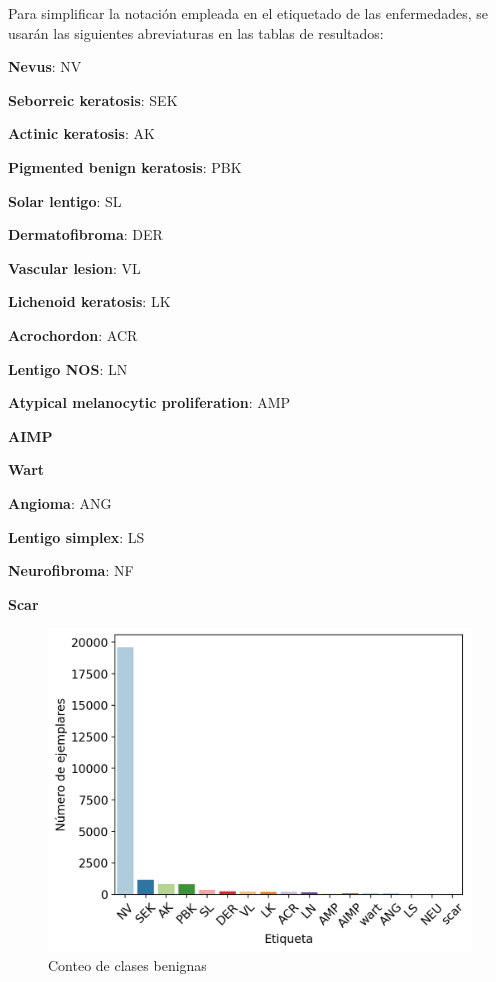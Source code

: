 Para simplificar la notación empleada en el etiquetado de las enfermedades, se usarán las siguientes abreviaturas en las tablas de resultados:
\begin{multiitem}
	\item \textbf{Nevus}: NV
	\item \textbf{Seborreic keratosis}: SEK 
	\item \textbf{Actinic keratosis}: AK            
	\item \textbf{Pigmented benign keratosis}: PBK 
	\item \textbf{Solar lentigo}: SL
	\item \textbf{Dermatofibroma}: DER 
	\item \textbf{Vascular lesion}: VL                        
	\item \textbf{Lichenoid keratosis}: LK
	\item \textbf{Acrochordon}: ACR
	\item \textbf{Lentigo NOS}: LN
	\item \textbf{Atypical melanocytic proliferation}: AMP
	\item \textbf{AIMP}                                  
	\item \textbf{Wart    }                                 
	\item \textbf{Angioma}: ANG                               
	\item \textbf{Lentigo simplex}: LS
	\item \textbf{Neurofibroma}: NF
	\item \textbf{Scar} 
\end{multiitem}

\begin{figure}[H]
	\centering
	\includegraphics[scale = 0.7]{imagenes/countbenign.png}
	\caption{Conteo de clases benignas}
	\label {fig:buenas}
\end{figure}

